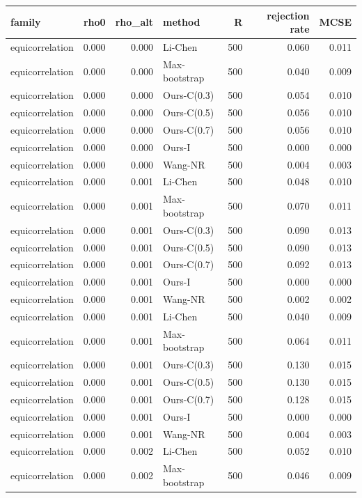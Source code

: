 \begin{tabular}{lrrlrrr}
\toprule
family & rho0 & rho\_alt & method & R & rejection rate & MCSE \\
\midrule
equicorrelation & 0.000 & 0.000 & Li-Chen & 500 & 0.060 & 0.011 \\
equicorrelation & 0.000 & 0.000 & Max-bootstrap & 500 & 0.040 & 0.009 \\
equicorrelation & 0.000 & 0.000 & Ours-C(0.3) & 500 & 0.054 & 0.010 \\
equicorrelation & 0.000 & 0.000 & Ours-C(0.5) & 500 & 0.056 & 0.010 \\
equicorrelation & 0.000 & 0.000 & Ours-C(0.7) & 500 & 0.056 & 0.010 \\
equicorrelation & 0.000 & 0.000 & Ours-I & 500 & 0.000 & 0.000 \\
equicorrelation & 0.000 & 0.000 & Wang-NR & 500 & 0.004 & 0.003 \\
equicorrelation & 0.000 & 0.001 & Li-Chen & 500 & 0.048 & 0.010 \\
equicorrelation & 0.000 & 0.001 & Max-bootstrap & 500 & 0.070 & 0.011 \\
equicorrelation & 0.000 & 0.001 & Ours-C(0.3) & 500 & 0.090 & 0.013 \\
equicorrelation & 0.000 & 0.001 & Ours-C(0.5) & 500 & 0.090 & 0.013 \\
equicorrelation & 0.000 & 0.001 & Ours-C(0.7) & 500 & 0.092 & 0.013 \\
equicorrelation & 0.000 & 0.001 & Ours-I & 500 & 0.000 & 0.000 \\
equicorrelation & 0.000 & 0.001 & Wang-NR & 500 & 0.002 & 0.002 \\
equicorrelation & 0.000 & 0.001 & Li-Chen & 500 & 0.040 & 0.009 \\
equicorrelation & 0.000 & 0.001 & Max-bootstrap & 500 & 0.064 & 0.011 \\
equicorrelation & 0.000 & 0.001 & Ours-C(0.3) & 500 & 0.130 & 0.015 \\
equicorrelation & 0.000 & 0.001 & Ours-C(0.5) & 500 & 0.130 & 0.015 \\
equicorrelation & 0.000 & 0.001 & Ours-C(0.7) & 500 & 0.128 & 0.015 \\
equicorrelation & 0.000 & 0.001 & Ours-I & 500 & 0.000 & 0.000 \\
equicorrelation & 0.000 & 0.001 & Wang-NR & 500 & 0.004 & 0.003 \\
equicorrelation & 0.000 & 0.002 & Li-Chen & 500 & 0.052 & 0.010 \\
equicorrelation & 0.000 & 0.002 & Max-bootstrap & 500 & 0.046 & 0.009 \\

\end{tabular}
